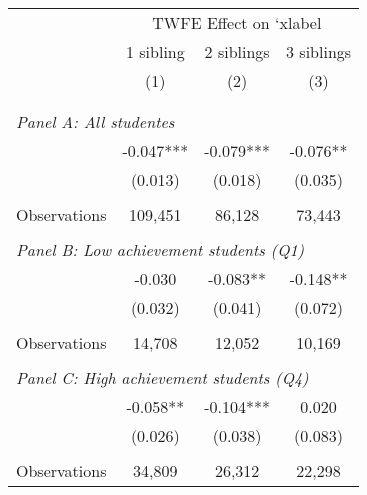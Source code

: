 \makeatletter
{}
{
\makeatother
\begin{tabular}{lccc}
\toprule
\cmidrule(lr){2-4}
& \multicolumn{3}{c}{TWFE Effect on `xlabel} \\
\cmidrule(lr){2-4}
& 1 sibling & 2 siblings & 3 siblings  \\
\cmidrule(lr){2-2} \cmidrule(lr){3-3} \cmidrule(lr){4-4}
& (1) & (2) & (3)\\
\bottomrule
&  &  &  \\
&  &  &   \\
\multicolumn{4}{l}{\textit{Panel A: All studentes}} \\
\hspace{3mm}        &      -0.047***&      -0.079***&      -0.076** \\
                    &     (0.013)   &     (0.018)   &     (0.035)   \\
                    &               &               &               \\
\hspace{3mm}Observations&     109,451   &      86,128   &      73,443   \\
 
&  &  &   \\
\multicolumn{4}{l}{\textit{Panel B: Low achievement students (Q1)}} \\
\hspace{3mm}        &      -0.030   &      -0.083** &      -0.148** \\
                    &     (0.032)   &     (0.041)   &     (0.072)   \\
                    &               &               &               \\
\hspace{3mm}Observations&      14,708   &      12,052   &      10,169   \\
 
&  &  &   \\
\multicolumn{4}{l}{\textit{Panel C: High achievement students (Q4)}} \\
\hspace{3mm}        &      -0.058** &      -0.104***&       0.020   \\
                    &     (0.026)   &     (0.038)   &     (0.083)   \\
                    &               &               &               \\
\hspace{3mm}Observations&      34,809   &      26,312   &      22,298   \\
 

\end{tabular}}

